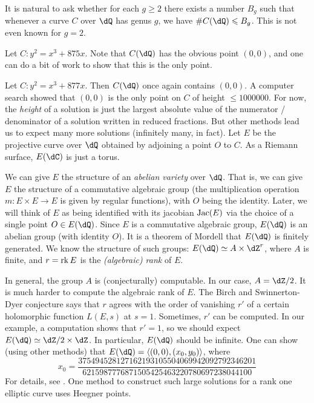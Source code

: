 \documentclass{article}
\begin{document}
It is natural to ask whether for each $g\geqslant 2$ there exists a number 
$B_g$ such that whenever a curve $C$ over $\dQ$ has genus $g$, we have 
$\# C(\dQ)\leqslant B_g$. This is not even known for $g=2$. 

\begin{example}
Let $C:y^2=x^3+875 x$. Note that $C(\dQ)$ has the obvious point 
$(0,0)$, and one can do a bit of work to show that this is the only point. 
\end{example}

\begin{example}
Let $C:y^2=x^3+877 x$. Then $C(\dQ)$ once again contains $(0,0)$. A 
computer search showed that $(0,0)$ is the only point on $C$ of height 
$\leqslant 1000000$. For now, the \emph{height} of a solution is just the 
largest absolute value of the numerator / denominator of a solution written 
in reduced fractions. But other methods lead us to expect many more solutions
(infinitely many, in fact). Let $E$ be the projective curve over $\dQ$ obtained 
by adjoining a point $O$ to $C$. As a Riemann surface, $E(\dC)$ is just a 
torus. 

We can give $E$ the 
structure of an \emph{abelian variety} over $\dQ$. That is, we can give $E$ the 
structure of a commutative algebraic group (the multiplication operation 
$m:E\times E\to E$ is given by regular functions), 
with $O$ being the identity. Later, we will think of $E$ as 
being identified with its jacobian $\operatorname{Jac}(E)$ via the choice of a single point 
$O\in E(\dQ)$. Since $E$ is a commutative algebraic group, $E(\dQ)$ is an 
abelian group (with identity $O$). It is a theorem of Mordell that $E(\dQ)$ is 
finitely generated. We know the structure of such groups: 
$E(\dQ)\simeq A\times \dZ^r$, where $A$ is finite, and $r=\operatorname{rk} E$ 
is the \emph{(algebraic) rank} of $E$. 

In general, the group $A$ is (conjecturally) computable. 
In our case, $A=\dZ/2$. It is much harder to 
compute the algebraic rank of $E$. The Birch and Swinnerton-Dyer 
conjecture says that $r$ agrees with the order of vanishing $r'$ of a certain 
holomorphic function $L(E,s)$ at $s=1$. Sometimes, $r'$ can be computed.  
In our example, a computation shows that $r'=1$, so we should expect 
$E(\dQ)\simeq \dZ/2\times\dZ$. In particular, 
$E(\dQ)$ should be infinite. One can show (using other methods) that 
$E(\dQ)=\langle (0,0),(x_0,y_0)\rangle$, where 
\[
  x_0 = \frac{37 5494 5281 2716 2193 1055 0406 9942 0927 9234 6201}{6215 9877 7687 1505 4254 6322 0780 6972 3804 4100}
\]
For details, see \cite{br84}. One method to construct such large solutions for 
a rank one elliptic curve uses Heegner points. 
\end{example}
\end{document}
